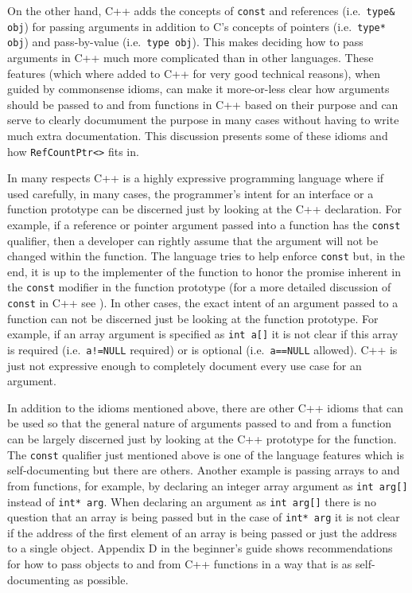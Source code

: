 On the other hand, C++ adds the concepts of {}\texttt{const} and
references (i.e.~{}\texttt{type\& obj}) for passing arguments in
addition to C's concepts of pointers (i.e.~{}\texttt{type* obj}) and
pass-by-value (i.e.~{}\texttt{type obj}).  This makes deciding how to
pass arguments in C++ much more complicated than in other languages.
These features (which where added to C++ for very good technical
reasons), when guided by commonsense idioms, can make it more-or-less
clear how arguments should be passed to and from functions in C++
based on their purpose and can serve to clearly documument the purpose
in many cases without having to write much extra documentation.  This
discussion presents some of these idioms and how
{}\texttt{Ref\-Count\-Ptr<>} fits in.

In many respects C++ is a highly expressive programming language where
if used carefully, in many cases, the programmer's intent for an
interface or a function prototype can be discerned just by looking at
the C++ declaration.  For example, if a reference or pointer argument
passed into a function has the {}\texttt{const} qualifier, then a
developer can rightly assume that the argument will not be changed
within the function.  The language tries to help enforce
{}\texttt{const} but, in the end, it is up to the implementer of the
function to honor the promise inherent in the {}\texttt{const}
modifier in the function prototype (for a more detailed discussion of
{}\texttt{const} in C++ see {}\cite[Section
10.2.7.1]{ref:stroustrup_2000}).  In other cases, the exact intent of
an argument passed to a function can not be discerned just be looking
at the function prototype.  For example, if an array argument is
specified as {}\texttt{int a[]} it is not clear if this array is
required (i.e.~{}\texttt{a!=NULL} required) or is optional
(i.e.~{}\texttt{a==NULL} allowed).  C++ is just not expressive enough
to completely document every use case for an argument.

In addition to the idioms mentioned above, there are other C++ idioms
that can be used so that the general nature of arguments passed to and
from a function can be largely discerned just by looking at the C++
prototype for the function.  The {}\texttt{const} qualifier just
mentioned above is one of the language features which is
self-documenting but there are others.  Another example is passing
arrays to and from functions, for example, by declaring an integer
array argument as {}\texttt{int arg[]} instead of {}\texttt{int* arg}.
When declaring an argument as {}\texttt{int arg[]} there is no
question that an array is being passed but in the case of
{}\texttt{int* arg} it is not clear if the address of the first
element of an array is being passed or just the address to a single
object.  Appendix D in the beginner's guide
{}\cite{ref:RefCountPtrBeginnersGuide} shows recommendations for how
to pass objects to and from C++ functions in a way that is as
self-documenting as possible.

